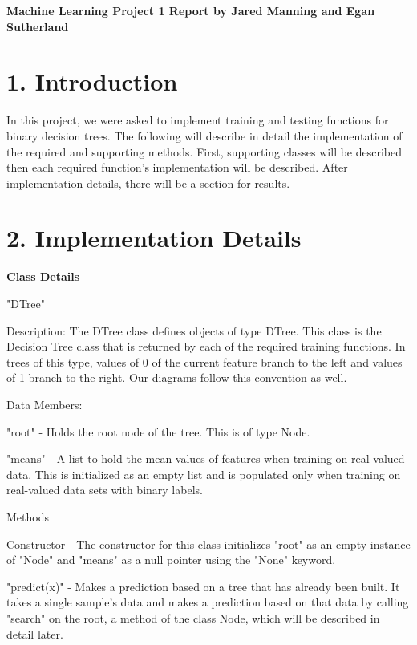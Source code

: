 \documentclass{article}
\begin{document}
\thispagestyle{empty}
\begin{center}
\large\bf Machine Learning Project 1 Report by Jared Manning and Egan Sutherland
\end{center}
\bigskip


\section*{1. Introduction}

\noindent In this project, we were asked to implement training and testing functions for binary decision trees. The following will describe in detail the implementation of the required and supporting methods. First, supporting classes will be described then each required function's implementation will be described. After implementation details, there will be a section for results.

\section*{2. Implementation Details}

\noindent \textbf{Class Details}

\noindent "DTree"

\indent Description: The DTree class defines objects of type DTree. This class is the Decision Tree class that is returned by each of the required training functions. In trees of this type, values of 0 of the current feature branch to the left and values of 1 branch to the right. Our diagrams follow this convention as well.

\indent Data Members:

\indent \textbullet "root" - Holds the root node of the tree. This is of type Node.

\indent \textbullet "means" - A list to hold the mean values of features when training on real-valued data. This is initialized as an empty list and is populated only when training on real-valued data sets with binary labels.

\indent Methods

\indent \textbullet Constructor - The constructor for this class initializes "root" as an empty instance of "Node" and "means" as a null pointer using the "None" keyword.

\indent \textbullet "predict(x)" - Makes a prediction based on a tree that has already been built. It takes a single sample's data and makes a prediction based on that data by calling "search" on the root, a method of the class Node, which will be described in detail later.
\end{document}
